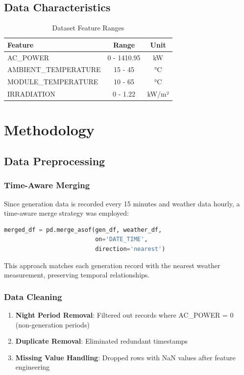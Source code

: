 \documentclass[12pt,a4paper]{article}
\begin{document}
\subsection{Data Characteristics}
\begin{table}[h]
\centering
\begin{tabular}{@{}lcc@{}}
\toprule
\textbf{Feature} & \textbf{Range} & \textbf{Unit} \\ \midrule
AC\_POWER & 0 - 1410.95 & kW \\
AMBIENT\_TEMPERATURE & 15 - 45 & °C \\
MODULE\_TEMPERATURE & 10 - 65 & °C \\
IRRADIATION & 0 - 1.22 & kW/m² \\ \bottomrule
\end{tabular}
\caption{Dataset Feature Ranges}
\label{tab:features}
\end{table}

\section{Methodology}

\subsection{Data Preprocessing}

\subsubsection{Time-Aware Merging}
Since generation data is recorded every 15 minutes and weather data hourly, a time-aware merge strategy was employed:

\begin{lstlisting}[language=Python]
merged_df = pd.merge_asof(gen_df, weather_df, 
                          on='DATE_TIME', 
                          direction='nearest')
\end{lstlisting}

This approach matches each generation record with the nearest weather measurement, preserving temporal relationships.

\subsubsection{Data Cleaning}
\begin{enumerate}
    \item \textbf{Night Period Removal}: Filtered out records where AC\_POWER = 0 (non-generation periods)
    \item \textbf{Duplicate Removal}: Eliminated redundant timestamps
    \item \textbf{Missing Value Handling}: Dropped rows with NaN values after feature engineering
\end{enumerate}
\end{document}
